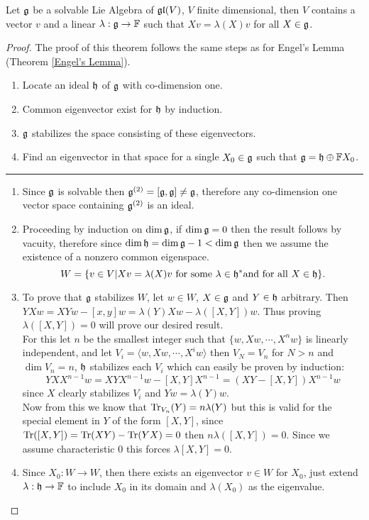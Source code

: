 \begin{teo}
	Let $\mathfrak{g}$ be a solvable Lie Algebra of $\mathfrak{gl}(V)$, $V$ finite dimensional, then $V$ contains a vector $v$ and a linear $\lambda:\mathfrak{g} \rightarrow \mathbb{F}$ such that $Xv = \lambda(X)v$ for all $X \in \mathfrak{g}$.
	\label{Lie's Theorem}
\end{teo}
\begin{proof}
	The proof of this theorem follows the same steps as for Engel's Lemma (Theorem \ref{Engel's Lemma}).
	\begin{enumerate}
		\item Locate an ideal $\mathfrak{h}$ of $\mathfrak{g}$ with co-dimension one.
		\item Common eigenvector exist for $\mathfrak{h}$ by induction.
		\item $\mathfrak{g}$ stabilizes the space consisting of these eigenvectors.
		\item Find an eigenvector in that space for a single $X_0 \in \mathfrak{g}$ such that $\mathfrak{g} = \mathfrak{h} \oplus \mathbb{F} X_0$.
	\end{enumerate}
	\noindent\rule{16cm}{0.4pt}
	\begin{enumerate}
		\item Since $\mathfrak{g}$ is solvable then $\mathfrak{g}^{(2)}=[\mathfrak{g},\mathfrak{g}]\not=\mathfrak{g}$, therefore any co-dimension one vector space  containing $\mathfrak{g}^{(2)}$ is an ideal.\\
		\item Proceeding by induction on $\dim \mathfrak{g}$, if $\dim \mathfrak{g}=0$ then the result follows by vacuity, therefore since $\dim \mathfrak{h} = \dim \mathfrak{g} - 1 < \dim \mathfrak{g}$ then we assume the existence of a nonzero common eigenspace. $$W = \{v \in V | Xv = \lambda(X)v \text{ for some } \lambda \in \mathfrak{h}^* \text{and for all }X \in \mathfrak{h}\}.$$
		\item To prove that $\mathfrak{g}$ stabilizes $W$, let $w \in W$, $X \in \mathfrak{g}$ and $Y \in \mathfrak{h}$ arbitrary. Then $YXw = XYw - [x,y]w = \lambda(Y)Xw - \lambda([X,Y])w$. Thus proving $\lambda([X,Y])=0$ will prove our desired result.\\
		For this let $n$ be the smallest integer such that $\{w,Xw,\cdots,X^nw\}$ is linearly independent, and let $V_i = \langle w, Xw , \cdots, X^i w\rangle$ then $V_{N} = V_n$ for $N>n$ and $\dim V_n = n$, $\mathfrak{h}$ stabilizes each $V_i$ which can easily be proven by induction:
		$$YXX^{n-1}w = XYX^{n-1}w - [X,Y]X^{n-1} = (XY - [X,Y])X^{n-1}w$$ since $X$ clearly stabilizes $V_i$ and $Yw = \lambda(Y)w$.\\
		Now from this we know that $\text{Tr}_{V_n}(Y)=n\lambda(Y)$ but this is valid for the special element in $Y$ of the form $[X,Y]$, since $\text{Tr}([X,Y])= \text{Tr}(XY)-\text{Tr}(YX)=0$ then $n\lambda([X,Y])=0$. Since we assume characteristic $0$ this forces $\lambda[X,Y]=0$.
		\item Since $X_0: W \rightarrow W$, then there exists an eigenvector $v \in W$ for $X_0$, just extend $\lambda: \mathfrak{h} \rightarrow \mathbb{F}$ to include $X_0$ in its domain and $\lambda(X_0)$ as the eigenvalue.
		\end{enumerate}
\end{proof}